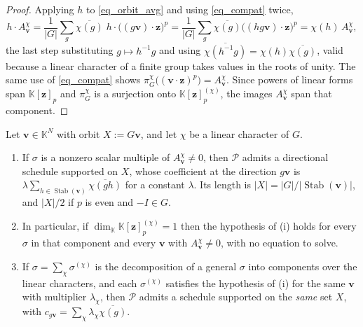 \documentclass[final]{siamltex}
\DeclareMathOperator{\Stab}{Stab}
\newcommand{\K}{\mathbb{K}}
\newcommand{\bz}{\bm{z}}
\newcommand{\bv}{\bm{v}}
\newcommand{\abs}[1]{\left|#1\right|}
\begin{document}
\begin{proof}
  Applying $h$ to \eqref{eq_orbit_avg} and using \eqref{eq_compat} twice,
  \begin{equation*}
    h\cdot A^{\chi}_{\bv}
    = \frac{1}{\abs{G}}\sum_{g}\overline{\chi(g)}\;h \cdot \bigl((g\bv)\cdot \bz\bigr)^{p}
    = \frac{1}{\abs{G}}\sum_{g}\overline{\chi(g)}\bigl((hg\bv)\cdot \bz\bigr)^{p}
    = \chi(h)\,A^{\chi}_{\bv},
  \end{equation*}
  the last step substituting $g \mapsto h^{-1}g$ and using
  $\overline{\chi(h^{-1}g)} = \chi(h)\overline{\chi(g)}$, valid because a linear
  character of a finite group takes values in the roots of unity.  The same use
  of \eqref{eq_compat} shows
  $\pi^{\chi}_{G}\bigl((\bv\cdot\bz)^{p}\bigr) = A^{\chi}_{\bv}$.  Since powers
  of linear forms span $\K[\bz]_{p}$ and $\pi^{\chi}_{G}$ is a surjection onto
  $\K[\bz]_{p}^{(\chi)}$, the images $A^{\chi}_{\bv}$ span that component.
\end{proof}

\begin{theorem}\label{thm_orbit}
  Let $\bv \in \K^{N}$ with orbit $X := G\bv$, and let $\chi$ be a linear
  character of $G$.
  \begin{enumerate}[label=\textup{(\roman*)}]
    \item If $\sigma$ is a nonzero scalar multiple of $A^{\chi}_{\bv} \neq 0$,
      then $\mathcal{P}$ admits a directional schedule supported on $X$, whose
      coefficient at the direction $g\bv$ is
      $\lambda\sum_{h \in \Stab(\bv)}\overline{\chi(gh)}$ for a constant
      $\lambda$.  Its length is $\abs{X} = \abs{G}/\abs{\Stab(\bv)}$, and
      $\abs{X}/2$ if $p$ is even and $-I \in G$.
    \item In particular, if $\dim_{\K}\K[\bz]_{p}^{(\chi)} = 1$ then the
      hypothesis of \textup{(i)} holds for every $\sigma$ in that component and
      every $\bv$ with $A^{\chi}_{\bv} \neq 0$, with no equation to solve.
    \item If $\sigma = \sum_{\chi} \sigma^{(\chi)}$ is the decomposition of a
      general $\sigma$ into components over the linear characters, and each
      $\sigma^{(\chi)}$ satisfies the hypothesis of \textup{(i)} for the same
      $\bv$ with multiplier $\lambda_{\chi}$, then $\mathcal{P}$ admits a
      schedule supported on the \emph{same} set $X$, with
      $c_{g\bv} = \sum_{\chi}\lambda_{\chi}\overline{\chi(g)}$.
  \end{enumerate}
\end{theorem}
\end{document}
